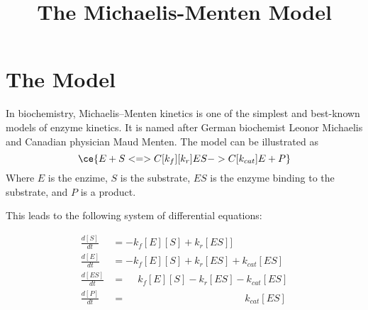 \documentclass{article}\usepackage{graphicx, color}
\begin{document}







\title{\large \sf The Michaelis-Menten Model}

\section{The Model}
In biochemistry, Michaelis–Menten kinetics is one of the simplest and
best-known models of enzyme kinetics. It is named after German biochemist
Leonor Michaelis and Canadian physician Maud Menten. 
The model can be illustrated as
\[
\ce{
E + S <=>C[k_f][k_r] ES ->C[k_{cat}] E + P
}
\]
Where $E$ is the enzime, $S$ is the substrate, $ES$ is the enzyme binding to
the substrate, and $P$ is a product.

This leads to the following system of differential equations:

\begin{align}
	\frac{d[S]}{dt} & = -k_f [E] [S] + k_r [ES] ]
	\label{dSdt}
	\\
	\frac{d[E]}{dt} & = -k_f [E] [S] + k_r [ES] + k_{cat} [ES]
	\label{dEdt}
	\\
	\frac{d[ES]}{dt} & = \phantom{-}k_f [E] [S] - k_r [ES] - k_{cat} [ES]
	\label{dESdt}
	\\
	\frac{d[P]}{dt} & = \phantom{-k_f [E] [S] + k_r [ES] + \;} k_{cat} [ES]
	\label{dPdt}
	\\
\end{align}
\end{document}
